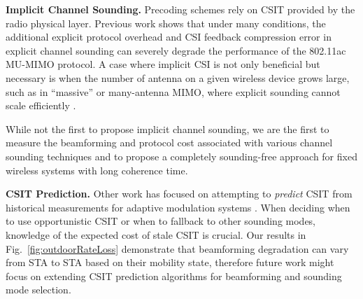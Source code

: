 


{\bf Implicit Channel Sounding.}
	Precoding schemes rely on \ac{CSIT} provided by the radio physical layer.
	Previous work shows that under many conditions, the additional explicit protocol overhead \cite{anandpuma, bejarano2014mute} and \ac{CSI} feedback compression error \cite{lou2013comparison, xie2013adaptive} in explicit channel sounding can severely degrade the performance of the 802.11ac \ac{MU-MIMO} protocol.
 A case where implicit \ac{CSI} is not only beneficial but necessary is when the number of antenna on a given wireless device grows large, such as in ``massive'' or many-antenna MIMO, where explicit sounding cannot scale efficiently \cite{shepard2012argos}. %

	While not the first to propose implicit channel sounding, we are the first to measure the beamforming and protocol cost associated with various channel sounding techniques and to propose a completely sounding-free approach for fixed wireless systems with long coherence time.

{\bf CSIT Prediction.}
 Other work has focused on attempting to \textit{predict} CSIT  from historical measurements for adaptive modulation systems \cite{duel2007fading}.
	When deciding when to use opportunistic \ac{CSIT} or when to fallback to other sounding modes, knowledge of the expected cost of stale CSIT is crucial.
	Our results in Fig.~\ref{fig:outdoorRateLoss} demonstrate that beamforming degradation can vary from STA to STA based on their mobility state, therefore future work might focus on extending CSIT prediction algorithms for beamforming and sounding mode selection.


